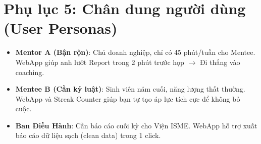 \section*{Phụ lục 5: Chân dung người dùng (User Personas)}

\begin{itemize}
    \item \textbf{Mentor A (Bận rộn)}: Chủ doanh nghiệp, chỉ có 45 phút/tuần cho Mentee. WebApp giúp anh lướt Report trong 2 phút trước họp $\to$ Đi thẳng vào coaching.
    \item \textbf{Mentee B (Cần kỷ luật)}: Sinh viên năm cuối, năng lượng thất thường. WebApp và Streak Counter giúp bạn tự tạo áp lực tích cực để không bỏ cuộc.
    \item \textbf{Ban Điều Hành}: Cần báo cáo cuối kỳ cho Viện ISME. WebApp hỗ trợ xuất báo cáo dữ liệu sạch (clean data) trong 1 click.
\end{itemize}
